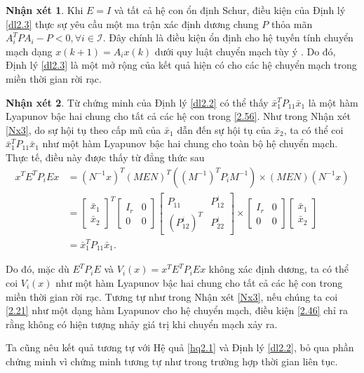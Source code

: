 \documentclass[12pt,a4paper]{report}
\theoremstyle{definition}
\newtheorem{nx}{Nhận xét}
\theoremstyle{definition}
\numberwithin{dl}{chapter}
\numberwithin{vd}{chapter}
\numberwithin{corollary}{chapter}
\numberwithin{lemma}{chapter}
\numberwithin{md}{chapter}
\numberwithin{dn}{chapter}
\numberwithin{cy}{chapter}
\numberwithin{nx}{chapter}
\begin{document}
\begin{nx} Khi $E=I$ và tất cả hệ con ổn định Schur, điều kiện của Định lý \ref{dl2.3} thực sự yêu cầu một ma trận xác định dương chung $P$  thỏa mãn $A_{i}^{T} P A_{i}-P<0, \forall i \in \mathcal{I}$. Đây chính là điều kiện ổn định  cho hệ tuyến tính chuyển mạch dạng $x(k+1)=A_{i} x(k)$ dưới quy luật chuyển mạch tùy ý \cite{Nar94}. Do đó, Định lý \ref{dl2.3} là một mở rộng của kết quả hiện có cho các hệ chuyển mạch trong miền thời gian rời rạc.
\end{nx}
\begin{nx} Từ chứng minh của Định lý \ref{dl2.2} có thể thấy  $\bar{x}_{1}^{T} P_{11} \bar{x}_{1}$ là một hàm Lyapunov bậc hai chung cho tất cả các hệ con trong \eqref{2.56}. Như trong Nhận xét \ref{Nx3}, do sự hội tụ theo cấp mũ của $\bar{x}_{1}$ dẫn đến sự hội tụ của $\bar{x}_{2}$, ta có thể coi $\bar{x}_{1}^{T} P_{11} \bar{x}_{1}$ như một hàm Lyapunov bậc hai chung cho toàn bộ hệ chuyển mạch. Thực tế, điều này được thấy từ đẳng thức sau
\begin{equation}\label{2.58}
\begin{aligned}
x^{T} E^{T} P_{i} E x &=\left(N^{-1} x\right)^{T}(M E N)^{T}\left(\left(M^{-1}\right)^{T} P_{i} M^{-1}\right) \times(M E N)\left(N^{-1} x\right) \\
&=\left[\begin{array}{c}
\bar{x}_{1} \\
\bar{x}_{2}
\end{array}\right]^{T}\left[\begin{array}{cc}
I_{r} & 0 \\
0 & 0
\end{array}\right]\left[\begin{array}{cc}
P_{11} & P_{12}^{i} \\
\left(P_{12}^{i}\right)^{T} & P_{22}^{i}
\end{array}\right]  \times\left[\begin{array}{cc}
I_{r} & 0 \\
0 & 0
\end{array}\right]\left[\begin{array}{l}
\bar{x}_{1} \\
\bar{x}_{2}
\end{array}\right] \\
& =\bar{x}_{1}^{T} P_{11} \bar{x}_{1} .
\end{aligned} 
\end{equation}

Do đó, mặc dù $E^{T} P_{i} E$ và $V_{i}(x)=x^{T} E^{T} P_{i} E x$ không xác định dương, ta có thể coi $V_{i}(x)$ như một hàm Lyapunov bậc hai chung cho tất cả các hệ con trong miền thời gian rời rạc. Tương tự như trong Nhận xét \ref{Nx3}, nếu chúng ta coi \eqref{2.21} như một dạng hàm Lyapunov cho hệ chuyển mạch, điều kiện \eqref{2.46} chỉ ra rằng không có hiện tượng nhảy giá trị khi chuyển mạch xảy ra.
\end{nx}
Ta cũng nêu kết quả tương tự với Hệ quả \ref{hq2.1} và Định lý \ref{dl2.2}, bỏ qua phần chứng minh vì chứng minh tương tự như trong trường hợp thời gian liên tục.\\ 
\end{document}
